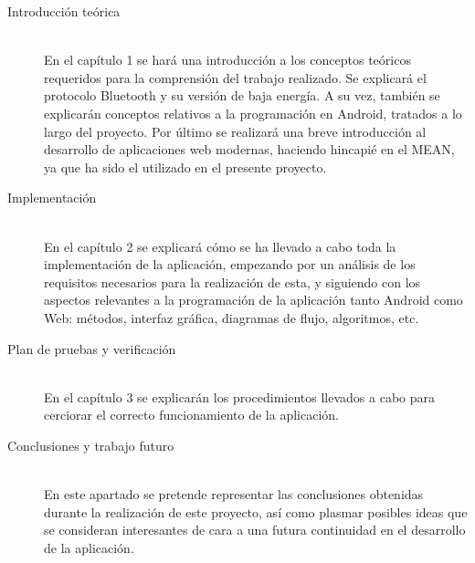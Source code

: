 
\begin{description}

\item[Introducción teórica]\hfill \\
En el capítulo 1 se hará una introducción a los conceptos teóricos requeridos para la comprensión del trabajo realizado.
Se explicará el protocolo Bluetooth y su versión de baja energía.
A su vez, también se explicarán conceptos relativos a la programación en Android, tratados a lo largo del proyecto.
Por último se realizará una breve introducción al desarrollo de aplicaciones web modernas, haciendo hincapié en el  MEAN, ya que ha sido el utilizado en el presente proyecto.

\item[Implementación]\hfill \\
En el capítulo 2 se explicará cómo se ha llevado a cabo toda la implementación de la aplicación, empezando por un análisis de los requisitos necesarios para la realización de esta, y siguiendo con los aspectos relevantes a la programación de la aplicación tanto Android como Web: métodos, interfaz gráfica, diagramas de flujo, algoritmos, etc.

\item[Plan de pruebas y verificación] \hfill \\
En el capítulo 3 se explicarán los procedimientos llevados a cabo para cerciorar el correcto funcionamiento de la aplicación.

\item[Conclusiones y trabajo futuro] \hfill \\
En este apartado se pretende representar las conclusiones obtenidas durante la realización de este proyecto, así como plasmar posibles ideas que se consideran interesantes de cara a una futura continuidad en el desarrollo de la aplicación.

\end{description}


\chapterend{}